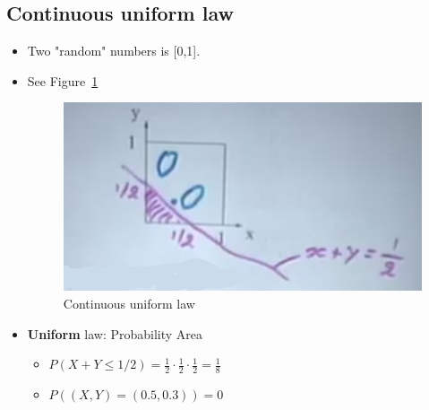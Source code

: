 \subsection{Continuous uniform law}
    \begin{itemize}
        \item Two "random" numbers is [0,1].
        \item See Figure~\ref{fig:1-9}
        \begin{figure}[h!]
            \centering
            \includegraphics[scale=0.7]{images/1-9}
            \caption{Continuous uniform law}
            \label{fig:1-9}
        \end{figure}
        \item \textbf{Uniform} law: Probability \equiv Area 
        \begin{itemize}
            \item $P(X+Y \leq 1/2) = \frac{1}{2} \cdot \frac{1}{2} \cdot \frac{1}{2} = \frac{1}{8}$
            \item $P((X,Y)=(0.5, 0.3)) = 0$
        \end{itemize}
    \end{itemize}

